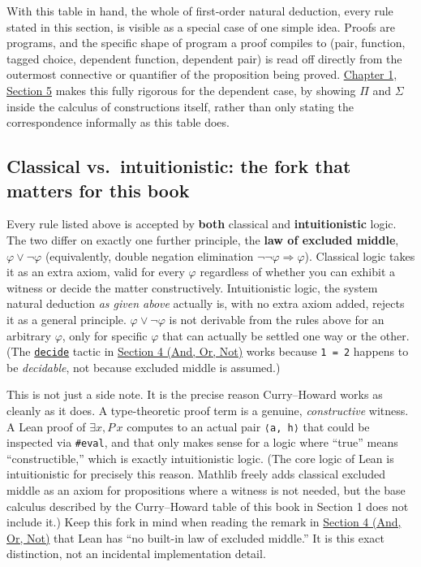 With this table in hand, the whole of first-order natural deduction, every rule stated in this section, is visible as a special case of one simple idea. Proofs are programs, and the specific shape of program a proof compiles to (pair, function, tagged choice, dependent function, dependent pair) is read off directly from the outermost connective or quantifier of the proposition being proved. \hyperref[sec:02-terminology-and-coc:02-pi-sigma-and-coc:1]{Chapter 1, Section 5} makes this fully rigorous for the dependent case, by showing \(\Pi\) and \(\Sigma\) inside the calculus of constructions itself, rather than only stating the correspondence informally as this table does.

\subsection{Classical vs.~intuitionistic: the fork that matters for this book}\label{sec:04-propositions-and-proofs:02-logic-recap:7}

Every rule listed above is accepted by \textbf{both} classical and \textbf{intuitionistic} logic. The two differ on exactly one further principle, the \textbf{law of excluded middle}, \(\varphi \vee \neg\varphi\) (equivalently, double negation elimination \(\neg\neg\varphi \Rightarrow \varphi\)). Classical logic takes it as an extra axiom, valid for every \(\varphi\) regardless of whether you can exhibit a witness or decide the matter constructively. Intuitionistic logic, the system natural deduction \emph{as given above} actually is, with no extra axiom added, rejects it as a general principle. \(\varphi \vee \neg\varphi\) is not derivable from the rules above for an arbitrary \(\varphi\), only for specific \(\varphi\) that can actually be settled one way or the other. (The \href{https://lean-lang.org/doc/reference/latest/Tactic-Proofs/Tactic-Reference/}{\texttt{decide}} tactic in \hyperref[sec:04-propositions-and-proofs:05-and-or-not:1]{Section 4 (And, Or, Not)} works because \texttt{1 = 2} happens to be \emph{decidable}, not because excluded middle is assumed.)

This is not just a side note. It is the precise reason Curry--Howard works as cleanly as it does. A type-theoretic proof term is a genuine, \emph{constructive} witness. A Lean proof of \(\exists x, P\, x\) computes to an actual pair \texttt{⟨a, h⟩} that could be inspected via \texttt{\#eval}, and that only makes sense for a logic where ``true'' means ``constructible,'' which is exactly intuitionistic logic. (The core logic of Lean is intuitionistic for precisely this reason. Mathlib freely adds classical excluded middle as an axiom for propositions where a witness is not needed, but the base calculus described by the Curry--Howard table of this book in Section 1 does not include it.) Keep this fork in mind when reading the remark in \hyperref[sec:04-propositions-and-proofs:05-and-or-not:1]{Section 4 (And, Or, Not)} that Lean has ``no built-in law of excluded middle.'' It is this exact distinction, not an incidental implementation detail.

